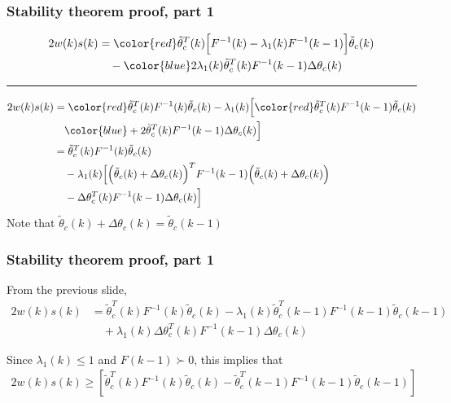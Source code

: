 \begin{frame}
    \frametitle{Stability theorem proof, part 1}

    \vspace*{-\baselineskip}
    \begin{align*}
        2 w(k) s(k) & = {\color{red} \tilde{\theta}_c^T(k)
            \Big[ F^{-1}(k) - \lambda_1(k) F^{-1}(k-1) \Big] \tilde{\theta}_c(k) } \\
        & \quad - {\color{blue} 2 \lambda_1(k) \tilde{\theta}_c^T(k) F^{-1}(k-1) \Delta \theta_c(k) }
    \end{align*}
    \hrule{\hfill}
    
    \vspace*{-\baselineskip}
    \begin{align*}
        2 w(k) s(k) & = {\color{red} \tilde{\theta}_c^T(k) F^{-1}(k) \tilde{\theta}_c(k) }
            - \lambda_1(k) \Big[ {\color{red} \tilde{\theta}_c^T(k) F^{-1}(k-1) \tilde{\theta}_c(k) } \\
        & \quad {\color{blue} + 2 \tilde{\theta}_c^T(k) F^{-1}(k-1) \Delta\theta_c(k) } \Big] \\
        & = \tilde{\theta}_c^T(k) F^{-1}(k) \tilde{\theta}_c(k) \\
        & \quad - \lambda_1(k) \Big[ \Big( \tilde{\theta}_c(k) + \Delta\theta_c(k) \Big)^T
            F^{-1}(k-1) \Big( \tilde{\theta}_c(k) + \Delta\theta_c(k) \Big) \\
        & \quad - \Delta\theta_c^T(k) F^{-1}(k-1) \Delta\theta_c(k) \Big]
    \end{align*}
    \pause
    Note that $\tilde{\theta}_c(k) + \Delta \theta_c(k) = \tilde{\theta}_c(k-1)$
\end{frame}

\begin{frame}
    \frametitle{Stability theorem proof, part 1}

    From the previous slide,
    \begin{align*}
        2 w(k) s(k) & = \tilde{\theta}_c^T(k) F^{-1}(k) \tilde{\theta}_c(k)
            - \lambda_1(k) \tilde{\theta}_c^T(k-1) F^{-1}(k-1) \tilde{\theta}_c(k-1) \\
        & \quad + \lambda_1(k) \Delta\theta_c^T(k) F^{-1}(k-1) \Delta\theta_c(k)
    \end{align*}
    \pause
    
    Since $\lambda_1(k) \leq 1$ and $F(k-1) \succ 0$, this implies that
    \begin{align*}
         2 w(k) s(k) \geq \left[ \tilde{\theta}_c^T(k) F^{-1}(k) \tilde{\theta}_c(k)
            - \tilde{\theta}_c^T(k-1) F^{-1}(k-1) \tilde{\theta}_c(k-1) \right]
    \end{align*}
\end{frame}

